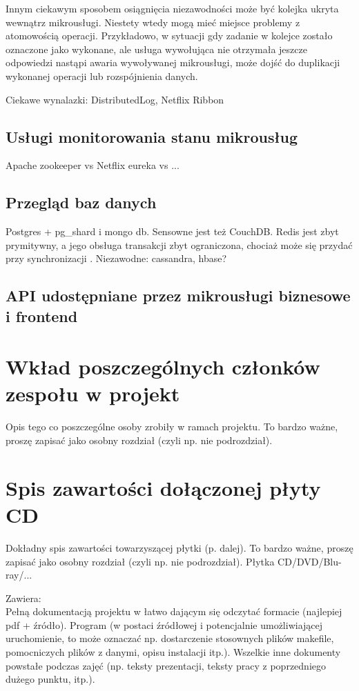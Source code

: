\documentclass[licencjacka]{pracamgr}
\begin{document}
Innym ciekawym sposobem osiągnięcia niezawodności może być kolejka ukryta wewnątrz mikrousługi. Niestety wtedy mogą mieć miejsce problemy z atomowością operacji. Przykładowo, w sytuacji gdy zadanie w kolejce zostało oznaczone jako
wykonane, ale usługa wywołująca nie otrzymała jeszcze odpowiedzi nastąpi awaria wywoływanej mikrousługi, może dojść do
duplikacji wykonanej operacji lub rozspójnienia danych.

Ciekawe wynalazki: DistributedLog, Netflix Ribbon

\section{Usługi monitorowania stanu mikrousług}
Apache zookeeper vs Netflix eureka vs ...

\section{Przegląd baz danych}
Postgres + pg\_shard i mongo db. Sensowne jest też CouchDB. Redis jest zbyt prymitywny, a jego obsługa transakcji zbyt ograniczona, chociaż
może się przydać przy synchronizacji \cite{redislock}. Niezawodne: cassandra, hbase?

\section{API udostępniane przez mikrousługi biznesowe i frontend}

\chapter{Wkład poszczególnych członków zespołu w projekt}\label{r:wklad}
Opis tego co poszczególne osoby zrobiły w ramach projektu. To bardzo ważne, proszę zapisać jako osobny rozdział (czyli np. nie podrozdział).

\appendix
\chapter{Spis zawartości dołączonej płyty CD}\label{r:spis}
Dokładny spis zawartości towarzyszącej płytki (p. dalej). To bardzo ważne, proszę zapisać jako osobny rozdział (czyli np. nie podrozdział). Płytka CD/DVD/Blu-ray/...

Zawiera:\\
Pełną dokumentacją projektu w łatwo dającym się odczytać formacie (najlepiej pdf + źródło).
Program (w postaci źródłowej i potencjalnie umożliwiającej uruchomienie, to może oznaczać np. dostarczenie stosownych plików makefile, pomocniczych plików z danymi, opisu instalacji itp.).
Wszelkie inne dokumenty powstałe podczas zajęć (np. teksty prezentacji, teksty pracy z poprzedniego dużego punktu, itp.).
\end{document}
